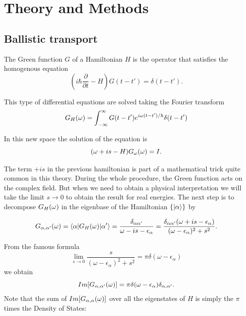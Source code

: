 \chapter{Theory and Methods \label{chap: Methods}}

\section{Ballistic transport \label{sec:transport} }

The Green function $G$ of a Hamiltonian $H$ is the operator that satisfies the homogenous equation 
\begin{equation}
    \left(i\hbar\frac{\partial}{\partial t}-H\right)G\left(t-t'\right)=\delta(t-t').
\end{equation}

This type of differential equations are solved taking the Fourier transform 
\begin{equation}
    G_{H}(\omega)=\int_{-\infty}^{\infty}G(t-t')e^{i\omega(t-t')/\hbar}\delta(t-t')
\end{equation}

In this new space the solution of the equation is 
$$(\omega+is -H)G_{\omega}(\omega)=I.$$ 

The term $+is$ in the previous hamiltonian is part of a mathematical trick quite common in this theory. During the whole procedure, the Green function acts on the complex field. But when we need to obtain a physical interpretation we will take the limit $s\rightarrow0$ to obtain the result for real energies. 
The next step is to decompose $G_{H}(\omega)$ in the eigenbase of the Hamiltonian $\{\vert \alpha \rangle\}$  by 


\begin{equation}
    G_{\alpha,\alpha'}(\omega)=\langle \alpha  \vert G_{H}(\omega)\vert \alpha' \rangle=\frac{\delta_{\alpha\alpha'}}{\omega - is -\epsilon_\alpha}=\frac{\delta_{\alpha\alpha'}(\omega + is -\epsilon_\alpha)}{(\omega-\epsilon_{\alpha})^{2}+s^{2}}.
\end{equation}

From the famous formula 
\begin{equation}
\lim_{s\rightarrow0}\frac{s}{(\omega-\epsilon_{\alpha})^{2}+s^{2}}=\pi\delta(\omega-\epsilon_{\alpha})
\end{equation}
we obtain 
\begin{equation}
    Im[G_{\alpha,\alpha'}(\omega)] = \pi \delta(\omega -\epsilon_\alpha)\delta_{\alpha,\alpha'}.
\end{equation}
Note that the sum of $Im[G_{\alpha,\alpha}(\omega)]$ over all the eigenstates of $H$ is simply the $\pi$ times the Density of States:

